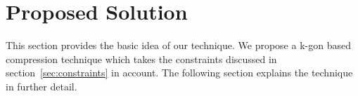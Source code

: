 \documentclass[conference]{IEEEtran}
\begin{document}
%
%
\section{Proposed Solution}
\label{s:proposed-solution}
This section provides the basic idea of our technique. We propose a k-gon based compression technique which takes the constraints discussed in section~\ref{sec:constraints} in account. The following section explains the technique in further detail.
%
\end{document}
